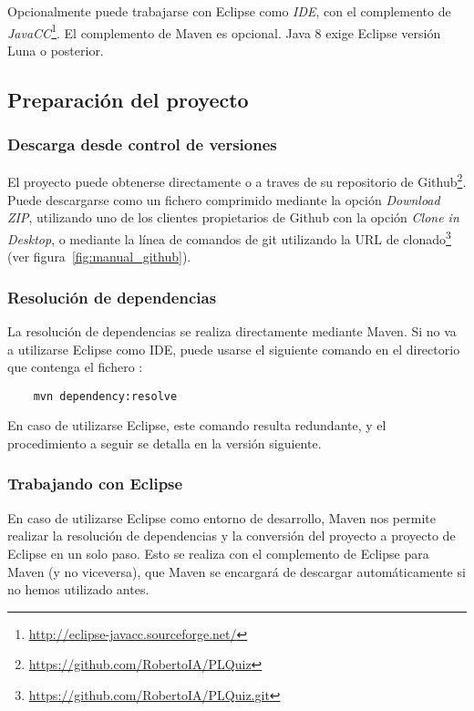 Opcionalmente puede trabajarse con Eclipse como \emph{IDE}, con el complemento de \emph{JavaCC}\footnote{\url{http://eclipse-javacc.sourceforge.net/}}.
El complemento de Maven es opcional.
Java 8 exige Eclipse versión Luna o posterior.

\subsection{Preparación del proyecto}
\subsubsection{Descarga desde control de versiones}
El proyecto puede obtenerse directamente o a traves de su repositorio de Github\footnote{\url{https://github.com/RobertoIA/PLQuiz}}. Puede descargarse como un fichero comprimido mediante la opción \emph{Download ZIP}, utilizando uno de los clientes propietarios de Github con la opción \emph{Clone in Desktop}, o mediante la línea de comandos de git utilizando la URL de clonado\footnote{\url{https://github.com/RobertoIA/PLQuiz.git}} (ver figura~\ref{fig:manual_github}).


\subsubsection{Resolución de dependencias}
La resolución de dependencias se realiza directamente mediante Maven.
Si no va a utilizarse Eclipse como IDE, puede usarse el siguiente comando en el directorio que contenga el fichero :
\begin{verbatim}
	mvn dependency:resolve
\end{verbatim}
En caso de utilizarse Eclipse, este comando resulta redundante, y el procedimiento a seguir se detalla en la versión siguiente.

\subsubsection{Trabajando con Eclipse}
En caso de utilizarse Eclipse como entorno de desarrollo, Maven nos permite realizar la resolución de dependencias y la conversión del proyecto a proyecto de Eclipse en un solo paso.
Esto se realiza con el complemento de Eclipse para Maven (y no viceversa), que Maven se encargará de descargar automáticamente si no hemos utilizado antes.

